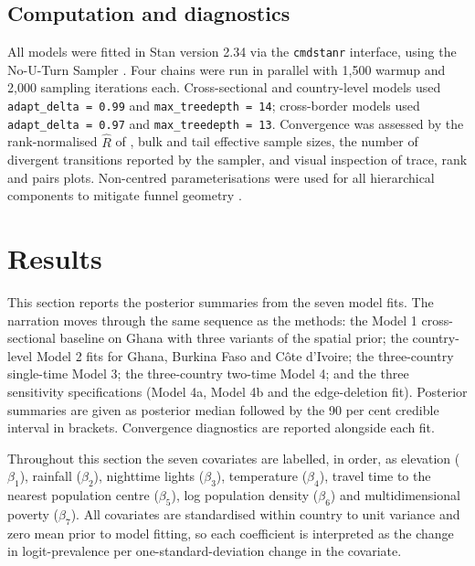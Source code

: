 \documentclass{article}
\begin{document}
\subsection{Computation and
diagnostics}\label{computation-and-diagnostics}

\label{sec:compute}

All models were fitted in Stan version 2.34 \citep{stan2024} via the
\texttt{cmdstanr} interface, using the No-U-Turn Sampler
\citep{hoffman2014}. Four chains were run in parallel with 1,500 warmup
and 2,000 sampling iterations each. Cross-sectional and country-level
models used \texttt{adapt\_delta\ =\ 0.99} and
\texttt{max\_treedepth\ =\ 14}; cross-border models used
\texttt{adapt\_delta\ =\ 0.97} and \texttt{max\_treedepth\ =\ 13}.
Convergence was assessed by the rank-normalised \(\hat{R}\) of
\citep{vehtari2021}, bulk and tail effective sample sizes, the number of
divergent transitions reported by the sampler, and visual inspection of
trace, rank and pairs plots. Non-centred parameterisations were used for
all hierarchical components to mitigate funnel geometry
\citep{betancourt2015}.

\section{Results}\label{results}

\label{sec:results}

This section reports the posterior summaries from the seven model fits.
The narration moves through the same sequence as the methods: the Model
1 cross-sectional baseline on Ghana with three variants of the spatial
prior; the country-level Model 2 fits for Ghana, Burkina Faso and Côte
d'Ivoire; the three-country single-time Model 3; the three-country
two-time Model 4; and the three sensitivity specifications (Model 4a,
Model 4b and the edge-deletion fit). Posterior summaries are given as
posterior median followed by the 90 per cent credible interval in
brackets. Convergence diagnostics are reported alongside each fit.

Throughout this section the seven covariates are labelled, in order, as
elevation (\(\beta_1\)), rainfall (\(\beta_2\)), nighttime lights
(\(\beta_3\)), temperature (\(\beta_4\)), travel time to the nearest
population centre (\(\beta_5\)), log population density (\(\beta_6\))
and multidimensional poverty (\(\beta_7\)). All covariates are
standardised within country to unit variance and zero mean prior to
model fitting, so each coefficient is interpreted as the change in
logit-prevalence per one-standard-deviation change in the covariate.
\end{document}

